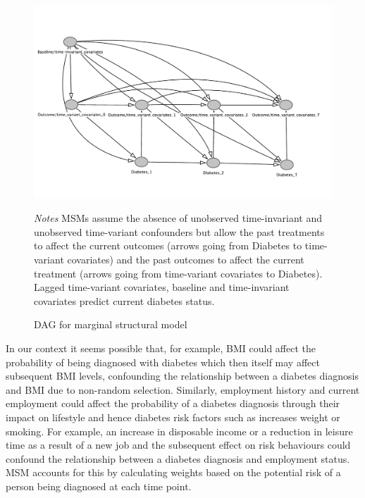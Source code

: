 \begin{figure}
\begin{center}
\caption{\label{fig:DAG_msm} \ac{DAG} for marginal structural model}
\includegraphics[scale=0.7]{Chapter5/DAG/dag_msm_alt}
\end{center}
\footnotesize{\textit{Notes} \acp{MSM} assume the absence of unobserved time-invariant and unobserved time-variant confounders but allow the past treatments to affect the current outcomes  (arrows going from Diabetes to time-variant covariates) and the past outcomes to affect the current treatment (arrows going from time-variant covariates to Diabetes).  Lagged time-variant covariates, baseline and time-invariant covariates predict current diabetes status.}

\end{figure}


In our context it seems possible that, for example, \ac{BMI} could affect the probability of being diagnosed with diabetes which then itself may affect subsequent \ac{BMI} levels, confounding the relationship between a diabetes diagnosis and \ac{BMI} due to non-random selection. Similarly, employment history and current employment could affect the probability of a diabetes diagnosis through their impact on lifestyle and hence diabetes risk factors such as increases weight or smoking. For example, an increase in disposable income or a reduction in leisure time as a result of a new job and the subsequent effect on risk behaviours could confound the relationship between a diabetes diagnosis and employment status. \ac{MSM} accounts for this by calculating weights based on the potential risk of a person being diagnosed at each time point. 

